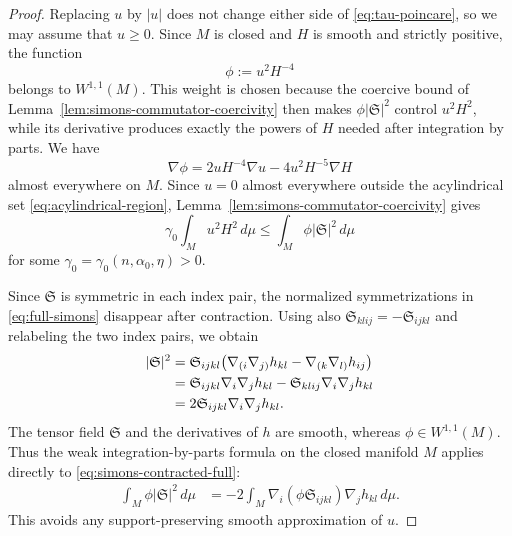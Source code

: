 \documentclass[11pt,reqno]{amsart}
\theoremstyle{definition}
\theoremstyle{remark}
\numberwithin{equation}{section}
\begin{document}
\begin{proof}
Replacing $u$ by $|u|$ does not change either side of
\eqref{eq:tau-poincare}, so we may assume that $u\geq0$.  Since $M$ is
closed and $H$ is smooth and strictly positive, the function
\begin{equation*}
 \phi:=u^2H^{-4}
\end{equation*}
belongs to $W^{1,1}(M)$.  This weight is chosen because the coercive bound
of Lemma~\ref{lem:simons-commutator-coercivity} then makes
$\phi|\mathfrak S|^2$ control $u^2H^2$, while its derivative produces exactly
the powers of $H$ needed after integration by parts.  We have
\begin{equation}\label{eq:poincare-weight-gradient}
 \nabla\phi
 =2uH^{-4}\nabla u-4u^2H^{-5}\nabla H 
\end{equation}
 almost everywhere on $M$.  Since $u=0$ almost everywhere outside the
 acylindrical set \eqref{eq:acylindrical-region},
 Lemma~\ref{lem:simons-commutator-coercivity} gives
\begin{equation}\label{eq:poincare-coercivity-start}
 \gamma_0\int_M u^2H^2\,d\mu
 \leq\int_M\phi|\mathfrak S|^2\,d\mu
\end{equation}
for some $\gamma_0=\gamma_0(n,\alpha_0,\eta)>0$.

Since
$\mathfrak S$ is symmetric in each index pair, the normalized
symmetrizations in \eqref{eq:full-simons} disappear after contraction.
Using also $\mathfrak S_{klij}=-\mathfrak S_{ijkl}$ and relabeling the two
index pairs, we obtain
\begin{align}
 |\mathfrak S|^2
 &=\mathfrak S_{ijkl}
   \bigl(\nabla_{(i}\nabla_{j)}h_{kl}
         -\nabla_{(k}\nabla_{l)}h_{ij}\bigr)\notag\\
 &=\mathfrak S_{ijkl}\nabla_i\nabla_jh_{kl}
   -\mathfrak S_{klij}\nabla_i\nabla_jh_{kl}\notag\\
 &=2\mathfrak S_{ijkl}\nabla_i\nabla_jh_{kl}.
 \label{eq:simons-contracted-full}
\end{align}
The tensor field $\mathfrak S$ and the derivatives of $h$ are smooth, whereas
$\phi\in W^{1,1}(M)$.  Thus the weak integration-by-parts formula on the
closed manifold $M$ applies directly to \eqref{eq:simons-contracted-full}:
\begin{align}
 \int_M\phi|\mathfrak S|^2\,d\mu
 &=-2\int_M\nabla_i(\phi\mathfrak S_{ijkl})
                  \nabla_jh_{kl}\,d\mu.\label{eq:poincare-ibp}
\end{align}
This avoids any support-preserving smooth approximation of $u$.


\end{proof}
\end{document}
